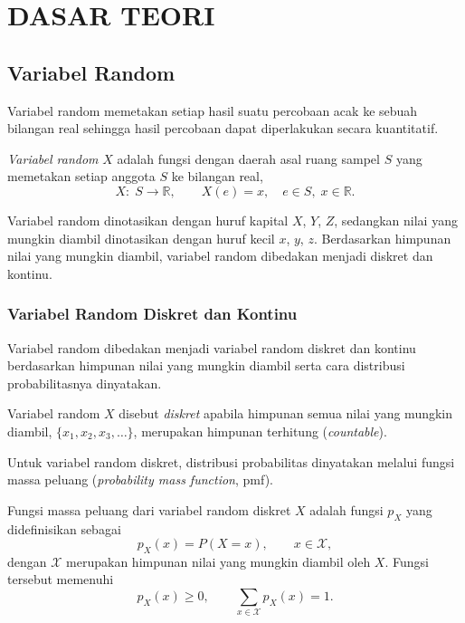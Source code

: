 \chapter{DASAR TEORI}

\section{Variabel Random}
\label{sec:variabelrandom}

Variabel random memetakan setiap hasil suatu percobaan acak ke sebuah bilangan
real sehingga hasil percobaan dapat diperlakukan secara kuantitatif.

\begin{definisi}
\label{def:varrandom}
\textit{Variabel random} $X$ adalah fungsi dengan daerah asal ruang sampel $S$
yang memetakan setiap anggota $S$ ke bilangan real,
\begin{equation*}
  X:\; S\longrightarrow\mathbb{R},\qquad X(e)=x,\quad e\in S,\; x\in\mathbb{R}.
  \label{eq:varrandom}
\end{equation*}
\end{definisi}

Variabel random dinotasikan dengan huruf kapital $X$, $Y$, $Z$, sedangkan nilai
yang mungkin diambil dinotasikan dengan huruf kecil $x$, $y$, $z$.
Berdasarkan himpunan nilai yang mungkin diambil, variabel random dibedakan
menjadi diskret dan kontinu.

\subsection{Variabel Random Diskret dan Kontinu}
\label{subsec:jenisvariabelrandom}

Variabel random dibedakan menjadi variabel random diskret dan kontinu
berdasarkan himpunan nilai yang mungkin diambil serta cara distribusi
probabilitasnya dinyatakan.

\begin{definisi}
\label{def:vardiskret}
Variabel random $X$ disebut \textit{diskret} apabila himpunan semua nilai
yang mungkin diambil, $\{x_1,x_2,x_3,\ldots\}$, merupakan himpunan
terhitung (\textit{countable}).
\end{definisi}

Untuk variabel random diskret, distribusi probabilitas dinyatakan melalui
fungsi massa peluang (\textit{probability mass function}, pmf).

\begin{definisi}
\label{def:pmfdiskret}
Fungsi massa peluang dari variabel random diskret $X$ adalah fungsi
$p_X$ yang didefinisikan sebagai
\begin{equation}
    p_X(x)=P(X=x),\qquad x\in\mathcal{X},
    \label{eq:pmfdiskret}
\end{equation}
dengan $\mathcal{X}$ merupakan himpunan nilai yang mungkin diambil oleh
$X$. Fungsi tersebut memenuhi
\begin{equation}
    p_X(x)\geq 0,\qquad
    \sum_{x\in\mathcal{X}}p_X(x)=1.
    \label{eq:syaratpmfdiskret}
\end{equation}
\end{definisi}

